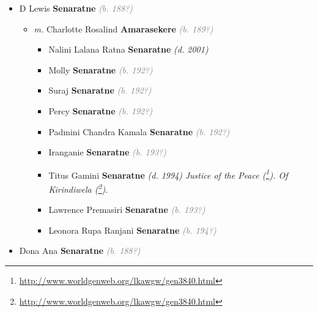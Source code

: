 \documentclass[10pt, openany]{book}
\begin{document}
\begin{itemize}
{\begin{itemize}
{\begin{itemize}
{\begin{itemize}
{\begin{itemize}
{  }
\end{itemize}
 }
\item{D Lewis \textbf{Senaratne} \textcolor{gray}{\textit{(b. 188?)}}
\begin{itemize}
\item{\textit{m.} Charlotte Rosalind \textbf{Amarasekere} \textcolor{gray}{\textit{(b. 189?)}}   \label{couple:00000799:00000865} \begin{itemize}
\item{Nalini Lalana Ratna \textbf{Senaratne} \textcolor{slorange}{\textit{(d. 2001)}}
   }
\item{Molly \textbf{Senaratne} \textcolor{gray}{\textit{(b. 192?)}}
 }
\item{Suraj \textbf{Senaratne} \textcolor{gray}{\textit{(b. 192?)}}
 }
\item{Percy \textbf{Senaratne} \textcolor{gray}{\textit{(b. 192?)}}
 }
\item{Padmini Chandra Kamala \textbf{Senaratne} \textcolor{gray}{\textit{(b. 192?)}}
   }
\item{Iranganie \textbf{Senaratne} \textcolor{gray}{\textit{(b. 193?)}}
 }
\item{Titus Gamini \textbf{Senaratne} \textcolor{slorange}{\textit{(d. 1994)}} \textcolor{slmaroon}{\textit{Justice of the Peace (\footnote{\url{http://www.worldgenweb.org/lkawgw/gen3840.html}}).
Of Kirindiwela (\footnote{\url{http://www.worldgenweb.org/lkawgw/gen3840.html}}).}}
  }
\item{Lawrence Premasiri \textbf{Senaratne} \textcolor{gray}{\textit{(b. 193?)}}
  }
\item{Leonora Rupa Ranjani \textbf{Senaratne} \textcolor{gray}{\textit{(b. 194?)}}
   }
\end{itemize}}
\end{itemize}
  }
\item{Dona Ana \textbf{Senaratne} \textcolor{gray}{\textit{(b. 188?)}}
  }
\end{itemize}}
\end{itemize}
}
\end{itemize}}
\end{itemize}
\end{document}
